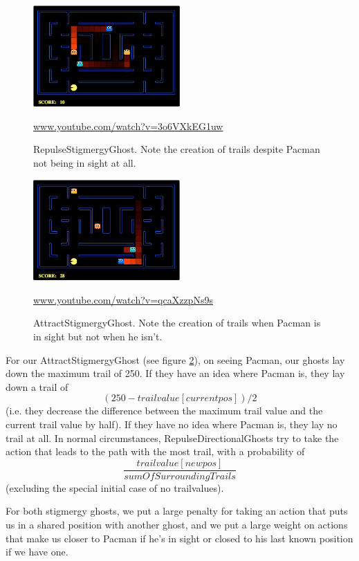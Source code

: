 \documentclass[11pt]{article}
\begin{document}
\begin{figure}[H]
	\includegraphics[width=0.5\textwidth]{RepulseGhost.png}
	\caption{RepulseStigmergyGhost. Note the creation of trails despite Pacman not being in sight at all.}
	\protect\url{www.youtube.com/watch?v=3o6VXkEG1uw} 
	\label{fig:repulseghost}
\end{figure}
\begin{figure}[H]
	\includegraphics[width=0.5\textwidth]{AttractGhost.png}
	\caption{AttractStigmergyGhost. Note the creation of trails when Pacman is in sight but not when he isn't.}
	\protect\url{www.youtube.com/watch?v=qcaXzzpNs9s} 
	\label{fig:attractghost}
\end{figure}

For our AttractStigmergyGhost (see figure \ref{fig:attractghost}), on seeing Pacman, our ghosts lay down the maximum trail of 250.  If they have an idea where Pacman is, they lay down a trail of $$(250 - trailvalue[currentpos]) / 2 $$ (i.e. they decrease the difference between the maximum trail value and the current trail value by half).   If they have no idea where Pacman is, they lay no trail at all. In normal circumstances, RepulseDirectionalGhosts try to take the action that leads to the path with the most trail, with a probability of $$\frac{trailvalue[newpos]}{sumOfSurroundingTrails}$$ (excluding the special initial case of no trailvalues).  



For both stigmergy ghosts, we put a large penalty for taking an action that puts us in a shared position with another ghost, and we put a large weight on actions that make us closer to Pacman if he's in sight or closed to his last known position if we have one.
\end{document}
